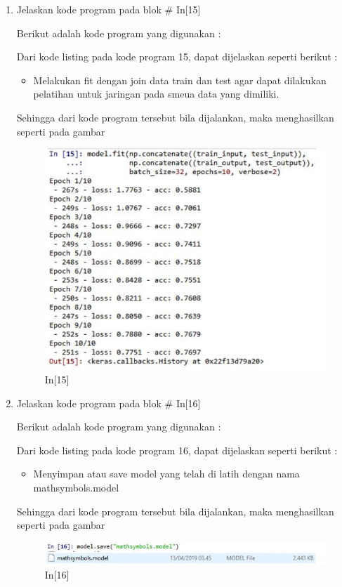 \begin{enumerate}
\begin{figure}[!htbp]
\end{figure}
\item Jelaskan kode program pada blok \# In[15]
\par Berikut adalah kode program yang digunakan :

\par Dari kode listing pada kode program 15, dapat dijelaskan seperti berikut :
\begin{itemize}
\item Melakukan fit dengan join data train dan test agar dapat dilakukan pelatihan untuk jaringan pada smeua data yang dimiliki.
\end{itemize}
\par Sehingga dari kode program tersebut bila dijalankan, maka menghasilkan seperti pada gambar 
\begin{figure}[!htbp]
	\centerline{\includegraphics[width=1\textwidth]{figures/andi/p15.PNG}}
	\caption{In[15]}
	\end{figure}

\item Jelaskan kode program pada blok \# In[16]
\par Berikut adalah kode program yang digunakan :

\par Dari kode listing pada kode program 16, dapat dijelaskan seperti berikut :
\begin{itemize}
\item Menyimpan atau save model yang telah di latih dengan nama mathsymbols.model 
\end{itemize}
\par Sehingga dari kode program tersebut bila dijalankan, maka menghasilkan seperti pada gambar 
\begin{figure}[!htbp]
	\centerline{\includegraphics[width=1\textwidth]{figures/andi/p16.PNG}}
	\caption{In[16]}
\end{figure}


\end{enumerate}
